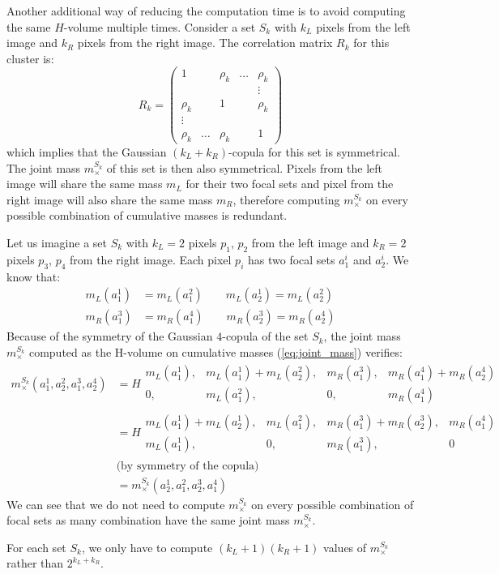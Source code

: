 Another additional way of reducing the computation time is to avoid computing the same $H$-volume multiple times. Consider a set $S_k$ with $k_L$ pixels from the left image and $k_R$ pixels from the right image. The correlation matrix $R_k$ for this cluster is:
\begin{equation}
    R_k=\begin{pmatrix}
        1 &  & \rho_k & \dots & \rho_k\\
         & & & & \vdots\\
        \rho_k &  & 1 & & \rho_k\\
        \vdots &  &  & & \\
        \rho_k & \dots & \rho_k &  & 1
    \end{pmatrix}\label{eq:corr_matrix_sym}
\end{equation}
which implies that the Gaussian $(k_L+k_R)$-copula for this set is symmetrical. The joint mass $m^{S_k}_\times$ of this set is then also symmetrical. Pixels from the left image will share the same mass $m_L$ for their two focal sets and pixel from the right image will also share the same mass $m_R$, therefore computing $m^{S_k}_\times$ on every possible combination of cumulative masses is redundant. 
\begin{example}
    Let us imagine a set $S_k$ with $k_L=2$ pixels $p_1$, $p_2$ from the left image and $k_R=2$ pixels $p_3$, $p_4$ from the right image. Each pixel $p_i$ has two focal sets $a^i_1$ and $a^i_2$.
    We know that:
    \begin{align*}
        m_L(a_1^1) &= m_L(a_1^2) \qquad m_L(a_2^1) = m_L(a_2^2)\\
        m_R(a_1^3) &= m_R(a_1^4) \qquad m_R(a_2^3) = m_R(a_2^4)
    \end{align*}
    Because of the symmetry of the Gaussian $4$-copula of the set $S_k$, the joint mass $m^{S_k}_\times$ computed as the H-volume on cumulative masses (\cref{eq:joint_mass}) verifies:
    \begin{align*}
        m^{S_k}_\times(a_1^1, a_2^2, a_1^3, a_2^4) &= H
        \begin{matrix}
            m_L(a_1^1), & m_L(a_1^1)+m_L(a_2^2), & m_R(a_1^3), & m_R(a_1^4)+m_R(a_2^4)\\
            0, & m_L(a^2_1), & 0, & m_R(a_1^4)
        \end{matrix}\\
        &=H
        \begin{matrix}
            m_L(a_1^1)+m_L(a_2^1), & m_L(a_1^2), & m_R(a_1^3)+m_R(a_2^3), & m_R(a_1^4)\\
            m_L(a^1_1), & 0, & m_R(a_1^3), & 0
        \end{matrix}\\
        &\text{(by symmetry of the copula)}\\
        &= m^{S_k}_\times(a_2^1, a_1^2, a_2^3, a_1^4)
    \end{align*}
    We can see that we do not need to compute $m^{S_k}_\times$ on every possible combination of focal sets as many combination have the same joint mass $m^{S_k}_\times$.
\end{example}
For each set $S_k$, we only have to compute $(k_L+1)(k_R+1)$ values of $m^{S_k}_\times$ rather than $2^{k_L+k_R}$.

